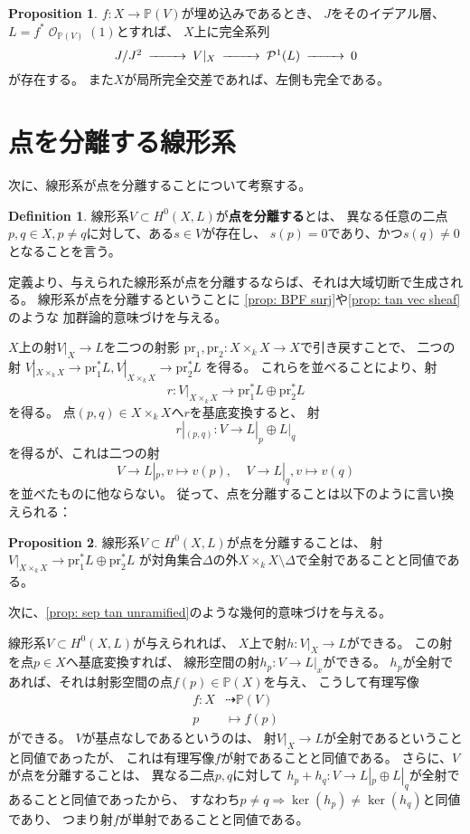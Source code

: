 \documentclass[uplatex]{jsarticle}
\theoremstyle{definition}
\newtheorem{prop}[prop]{Proposition}
\newtheorem{defi}[defi]{Definition}
\renewcommand{\P}{\mathbb{P}}
\newcommand{\mcO}{\mathcal{O}}
\newcommand{\mcP}{\mathcal{P}}
\DeclareMathOperator{\OOO}{\mcO}
\newcommand{\OO}[1]{\OOO_{#1}}
\newcommand{\dto}{\dashrightarrow}
\begin{document}
\begin{prop}
  \(f:X\to \P(V)\)が埋め込みであるとき、
  \(J\)をそのイデアル層、\(L=f^*\OO{\P(V)}(1)\)とすれば、
  \(X\)上に完全系列
  \[
  \begin{CD}
    J/J^2 @>>> V|_X @>>> \mcP^1(L) @>>> 0
  \end{CD}
  \]
  が存在する。
  また\(X\)が局所完全交差であれば、左側も完全である。
\end{prop}




\section{点を分離する線形系}


次に、線形系が点を分離することについて考察する。


\begin{defi}
  線形系\(V\subset H^0(X,L)\)が\textbf{点を分離する}とは、
  異なる任意の二点\(p,q\in X , p\neq q\)に対して、ある\(s\in V\)が存在し、
  \(s(p)=0\)であり、かつ\(s(q)\neq 0\)となることを言う。
\end{defi}

定義より、与えられた線形系が点を分離するならば、それは大域切断で生成される。
線形系が点を分離するということに
\autoref{prop: BPF surj}や\autoref{prop: tan vec sheaf}のような
加群論的意味づけを与える。

\(X\)上の射\(V|_X\to L\)を二つの射影
\(\mathrm{pr}_1,\mathrm{pr}_2:X\times_kX\to X\)で引き戻すことで、
二つの射
\(V|_{X\times_kX}\to \mathrm{pr}_1^*L ,
V|_{X\times_kX}\to \mathrm{pr}_2^*L\)
を得る。
これらを並べることにより、射
\[
r:V|_{X\times_kX} \to \mathrm{pr}_1^*L\oplus \mathrm{pr}_2^*L
\]
を得る。
点\((p,q)\in X\times_kX\)へ\(r\)を基底変換すると、
射
\[
r|_{(p,q)}: V\to L|_p\oplus L|_q
\]
を得るが、これは二つの射
\[
V\to L|_p, v\mapsto v(p), \ \ \ \ \ V\to L|_q, v\mapsto v(q)
\]
を並べたものに他ならない。
従って、点を分離することは以下のように言い換えられる：

\begin{prop}
  線形系\(V\subset H^0(X,L)\)が点を分離することは、
  射\(V|_{X\times_kX}\to \mathrm{pr}_1^*L\oplus \mathrm{pr}_2^*L\)
  が対角集合\(\Delta\)の外\(X\times_kX\setminus \Delta\)で全射であることと同値である。
\end{prop}

次に、\autoref{prop: sep tan unramified}のような幾何的意味づけを与える。

線形系\(V\subset H^0(X,L)\)が与えられれば、
\(X\)上で射\(h:V|_X\to L\)ができる。
この射を点\(p\in X\)へ基底変換すれば、
線形空間の射\(h_p:V\to L|_x\)ができる。
\(h_p\)が全射であれば、それは射影空間の点\(f(p)\in \P(X)\)を与え、
こうして有理写像
\begin{align*}
  f:X &\dto \P(V) \\
  p &\mapsto f(p)
\end{align*}
ができる。
\(V\)が基点なしであるというのは、
射\(V|_X\to L\)が全射であるということと同値であったが、
これは有理写像\(f\)が射であることと同値である。
さらに、\(V\)が点を分離することは、
異なる二点\(p,q\)に対して
\(h_p+h_q:V\to L|_p\oplus L|_q\)が全射であることと同値であったから、
すなわち\(p\neq q \Rightarrow \ker(h_p)\neq \ker(h_q)\)と同値であり、
つまり射\(f\)が単射であることと同値である。
\end{document}
